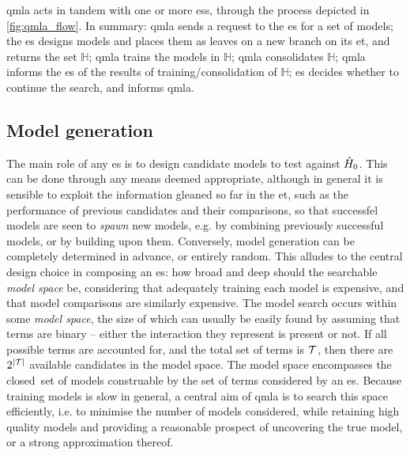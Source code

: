 \gls{qmla} acts in tandem with one or more \glspl{es}, through the process depicted in \cref{fig:qmla_flow}. 
In summary: 
    \gls{qmla} sends a request to the \gls{es} for a set of models; 
    the \gls{es} designs models and places them as leaves on a new branch on its \gls{et}, and returns the set $\mathbb{H}$; 
    \gls{qmla} trains the models in $\mathbb{H}$; 
    \gls{qmla} consolidates $\mathbb{H}$;
    \gls{qmla} informs the \gls{es} of the results of training/consolidation of $\mathbb{H}$; 
    \gls{es} decides whether to continue the search, and informs \gls{qmla}.


\subsection{Model generation}\label{sec:model_generation}
The main role of any \gls{es} is to design candidate models to test against $\hat{H}_0$. 
This can be done through any means deemed appropriate, 
    although in general it is sensible to exploit the information gleaned so far in the \gls{et}, 
    such as the performance of previous candidates and their comparisons, 
    so that successfel models are seen to \emph{\gls{spawn}} new models, 
    e.g. by combining previously successful models, or by building upon them. 
Conversely, model generation can be completely determined in advance, or entirely random.
This alludes to the central design choice in composing an \gls{es}: 
    how broad and deep should the searchable \emph{model space} be, 
    considering that adequately training each model
    is expensive, and that model comparisons are similarly expensive. 
The  \gls{model search}  occurs within some \emph{\gls{model space}}, the size of which can usually be easily found 
    by assuming that terms are binary -- either the interaction they represent is present or not. 
If all possible terms are accounted for, and the total set of terms is $\mathcal{T}$,
    then there are $2^{\left\lvert \mathcal{T} \right\rvert}$ available candidates in the model space. 
The \gls{model space} encompasses the closed\footnotemark \ set of models construable by the set of terms considered by an \gls{es}. 
Because training models is slow in general,
    a central aim of \gls{qmla} is to search this space efficiently,
    i.e. to minimise the number of models considered, while retaining high quality models and 
    providing a reasonable prospect of uncovering the \gls{true model}, or a strong approximation thereof. 


